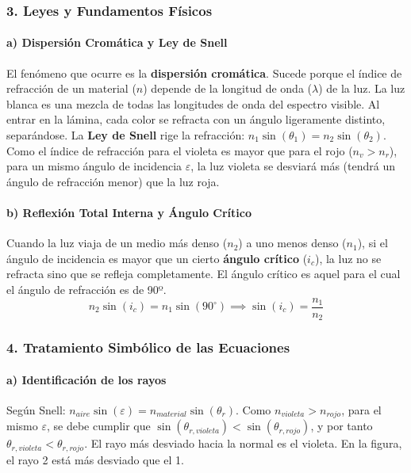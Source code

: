 \subsubsection*{3. Leyes y Fundamentos Físicos}
\paragraph*{a) Dispersión Cromática y Ley de Snell}
El fenómeno que ocurre es la \textbf{dispersión cromática}. Sucede porque el índice de refracción de un material ($n$) depende de la longitud de onda ($\lambda$) de la luz. La luz blanca es una mezcla de todas las longitudes de onda del espectro visible. Al entrar en la lámina, cada color se refracta con un ángulo ligeramente distinto, separándose.
La \textbf{Ley de Snell} rige la refracción: $n_1 \sin(\theta_1) = n_2 \sin(\theta_2)$.
Como el índice de refracción para el violeta es mayor que para el rojo ($n_v > n_r$), para un mismo ángulo de incidencia $\varepsilon$, la luz violeta se desviará más (tendrá un ángulo de refracción menor) que la luz roja.

\paragraph*{b) Reflexión Total Interna y Ángulo Crítico}
Cuando la luz viaja de un medio más denso ($n_2$) a uno menos denso ($n_1$), si el ángulo de incidencia es mayor que un cierto \textbf{ángulo crítico} ($i_c$), la luz no se refracta sino que se refleja completamente. El ángulo crítico es aquel para el cual el ángulo de refracción es de 90º.
$$ n_2 \sin(i_c) = n_1 \sin(90^\circ) \implies \sin(i_c) = \frac{n_1}{n_2} $$

\subsubsection*{4. Tratamiento Simbólico de las Ecuaciones}
\paragraph*{a) Identificación de los rayos}
Según Snell: $n_{aire} \sin(\varepsilon) = n_{material} \sin(\theta_r)$. Como $n_{violeta} > n_{rojo}$, para el mismo $\varepsilon$, se debe cumplir que $\sin(\theta_{r,violeta}) < \sin(\theta_{r,rojo})$, y por tanto $\theta_{r,violeta} < \theta_{r,rojo}$. El rayo más desviado hacia la normal es el violeta. En la figura, el rayo 2 está más desviado que el 1.

